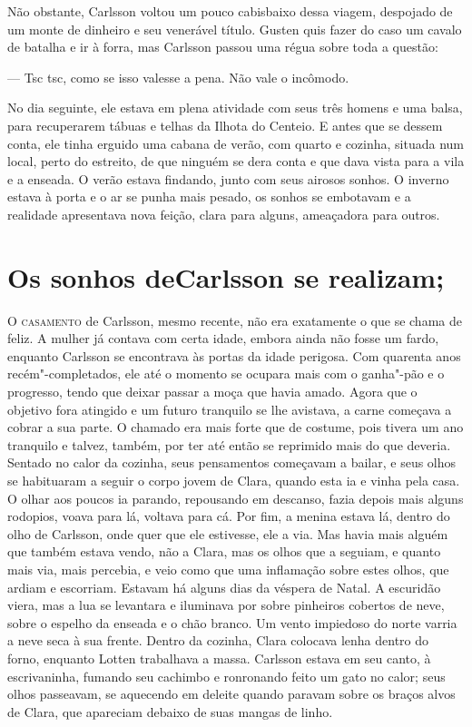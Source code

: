 Não obstante, Carlsson voltou um pouco cabisbaixo dessa viagem, despojado de um
monte de dinheiro e seu venerável título. Gusten quis fazer do caso um cavalo de
batalha e ir à forra, mas Carlsson passou uma régua sobre toda a questão:

--- Tsc tsc, como se isso valesse a pena. Não vale o incômodo.

No dia seguinte, ele estava em plena atividade com seus três homens e uma balsa,
para recuperarem tábuas e telhas da Ilhota do Centeio. E antes que se dessem
conta, ele tinha erguido uma cabana de verão, com quarto e cozinha, situada num
local, perto do estreito, de que ninguém se dera conta e que dava vista
para a vila e a enseada. O verão estava findando, junto com seus airosos sonhos.
O inverno estava à porta e o ar se punha mais pesado, os sonhos se embotavam 
e a realidade apresentava nova feição, clara para alguns, ameaçadora para outros.

\chapter[Os sonhos de Carlsson se realizam\ldots]{Os sonhos de\break Carlsson se realizam; }

\textsc{O casamento} de Carlsson, mesmo recente, não era exatamente o que
se chama de feliz. A mulher já contava com certa idade, embora ainda não fosse
um fardo, enquanto Carlsson se encontrava às portas da idade perigosa. 
Com quarenta anos recém"-completados, ele até o momento se ocupara mais com o ganha"-pão e o
progresso, tendo que deixar passar a moça que havia amado. Agora que o objetivo
fora atingido e um futuro tranquilo se lhe avistava, a carne começava a cobrar a
sua parte. O chamado era mais forte que de costume, pois tivera um ano tranquilo
e talvez, também, por ter até então se reprimido mais do que deveria.
Sentado no calor da cozinha, seus pensamentos começavam a bailar, e seus olhos
se habituaram a seguir o corpo jovem de Clara, quando esta ia e vinha pela casa.
O olhar aos poucos ia parando, repousando em descanso, fazia depois mais alguns
rodopios, voava para lá, voltava para cá. Por fim, a menina estava lá, dentro do
olho de Carlsson, onde quer que ele estivesse, ele a via. Mas havia mais alguém que também
estava vendo, não a Clara, mas os olhos que a seguiam, e quanto mais via, mais
percebia, e veio como que uma inflamação sobre estes olhos, que ardiam e
escorriam. Estavam há alguns dias da véspera de Natal. A escuridão viera, mas a
lua se levantara e iluminava por sobre pinheiros cobertos de neve, sobre o
espelho da enseada e o chão branco. Um vento impiedoso do norte varria a neve
seca à sua frente. Dentro da cozinha, Clara colocava lenha dentro do forno,
enquanto Lotten trabalhava a massa. Carlsson estava em seu canto, à
escrivaninha, fumando seu cachimbo e ronronando feito um gato no calor; seus
olhos passeavam, se aquecendo em deleite quando paravam sobre os braços alvos de
Clara, que apareciam debaixo de suas mangas de linho.

